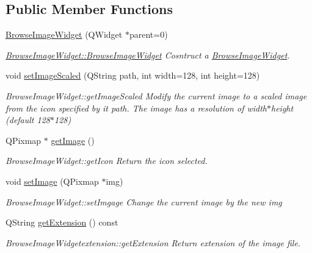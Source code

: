 \subsection*{Public Member Functions}
\begin{DoxyCompactItemize}
\item 
\hyperlink{classGui_1_1Widgets_1_1BrowseImageWidget_a711ade1d937039ec0ec5de12245752e3}{Browse\-Image\-Widget} (Q\-Widget $\ast$parent=0)
\begin{DoxyCompactList}\small\item\em \hyperlink{classGui_1_1Widgets_1_1BrowseImageWidget_a711ade1d937039ec0ec5de12245752e3}{Browse\-Image\-Widget\-::\-Browse\-Image\-Widget} Cosntruct a \hyperlink{classGui_1_1Widgets_1_1BrowseImageWidget}{Browse\-Image\-Widget}. \end{DoxyCompactList}\item 
void \hyperlink{classGui_1_1Widgets_1_1BrowseImageWidget_a3e7dcfb78974b9ef017f1ba7284648c6}{set\-Image\-Scaled} (Q\-String path, int width=128, int height=128)
\begin{DoxyCompactList}\small\item\em Browse\-Image\-Widget\-::get\-Image\-Scaled Modify the current image to a scaled image from the icon specified by it {\itshape path}. The image has a resolution of {\itshape width}$\ast${\itshape height} (default 128$\ast$128) \end{DoxyCompactList}\item 
Q\-Pixmap $\ast$ \hyperlink{classGui_1_1Widgets_1_1BrowseImageWidget_a0c640aaf8c290b24098824339665045f}{get\-Image} ()
\begin{DoxyCompactList}\small\item\em Browse\-Image\-Widget\-::get\-Icon Return the icon selected. \end{DoxyCompactList}\item 
void \hyperlink{classGui_1_1Widgets_1_1BrowseImageWidget_a77255d36f24a1c41840f6cd0f99ed950}{set\-Image} (Q\-Pixmap $\ast$img)
\begin{DoxyCompactList}\small\item\em Browse\-Image\-Widget\-::set\-Imgage Change the current image by the new {\itshape img} \end{DoxyCompactList}\item 
Q\-String \hyperlink{classGui_1_1Widgets_1_1BrowseImageWidget_ab126e24395c6a273fd73ded05aa204a5}{get\-Extension} () const 
\begin{DoxyCompactList}\small\item\em Browse\-Image\-Widgetextension\-::get\-Extension Return extension of the image file. \end{DoxyCompactList}\end{DoxyCompactItemize}


